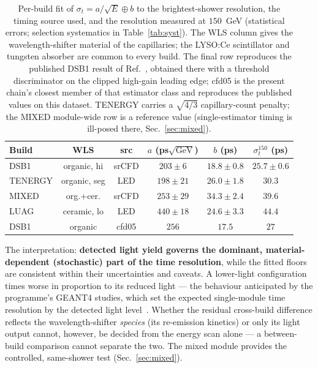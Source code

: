 \documentclass[final,5p,times,twocolumn]{elsarticle}
\begin{document}
\begin{table}[t]
\centering
\caption{Per-build fit of $\sigma_t=a/\sqrt{E}\oplus b$ to the brightest-shower
resolution, the timing source used, and the resolution measured at $150$~GeV
(statistical errors; selection systematics in Table~\ref{tab:syst}). The WLS column
gives the wavelength-shifter material of the capillaries; the LYSO:Ce scintillator and
tungsten absorber are common to every build. The final row reproduces the published
DSB1 result of Ref.~\cite{radical}, obtained there with a threshold discriminator on
the clipped high-gain leading edge; cfd05 is the present chain's closest member of that
estimator class and reproduces the published values on this dataset. TENERGY carries a $\sqrt{4/3}$ capillary-count penalty; the MIXED
module-wide row is a reference value (single-estimator timing is ill-posed there,
Sec.~\ref{sec:mixed}).}
\label{tab:builds}
\footnotesize
\setlength{\tabcolsep}{3pt}
\begin{tabular}{@{}lccccc@{}}
\toprule
Build & WLS & src & $a$ (ps$\sqrt{\mathrm{GeV}}$) & $b$ (ps) & $\sigma_t^{150}$ (ps) \\
\midrule
DSB1     & organic, hi   & srCFD & $203\pm6$  & $18.8\pm0.8$ & $25.7\pm0.6$ \\
TENERGY  & organic, seg  & LED   & $198\pm21$ & $26.0\pm1.8$ & $30.3$ \\
MIXED    & org.+cer.     & srCFD & $253\pm29$ & $34.3\pm2.4$ & $39.6$ \\
LUAG     & ceramic, lo   & LED   & $440\pm18$ & $24.6\pm3.3$ & $44.4$ \\
\midrule
DSB1\,\cite{radical} & organic & cfd05 & $256$ & $17.5$ & $27$ \\
\bottomrule
\end{tabular}
\end{table}

The interpretation: \textbf{detected light yield governs the dominant,
material-dependent (stochastic) part of the time resolution}, while the fitted floors
are consistent within their uncertainties and caveats. A lower-light configuration times
worse in proportion to its reduced light --- the behaviour anticipated by the
programme's GEANT4 studies, which set the expected single-module time resolution by the
detected light level~\cite{radical,instruments2022}. Whether the residual cross-build difference
reflects the wavelength-shifter \emph{species} (its re-emission kinetics) or only its
light output cannot, however, be decided from the energy scan alone --- a between-build
comparison cannot separate the two. The mixed module provides the controlled,
same-shower test (Sec.~\ref{sec:mixed}).
\end{document}
